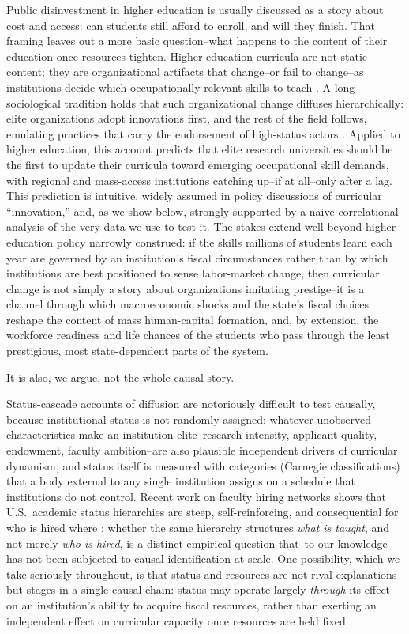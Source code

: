 \documentclass[11pt, letterpaper]{article}
\newcommand{\parencite}[1]{\cite{#1}}
\begin{document}
Public disinvestment in higher education is usually discussed as a story about cost and access: can students still afford to enroll, and will they finish. That framing leaves out a more basic question--what happens to the content of their education once resources tighten. Higher-education curricula are not static content; they are organizational artifacts that change--or fail to change--as institutions decide which occupationally relevant skills to teach \parencite{autorskill2003, javadiansabet2024}. A long sociological tradition holds that such organizational change diffuses hierarchically: elite organizations adopt innovations first, and the rest of the field follows, emulating practices that carry the endorsement of high-status actors \parencite{podolny1993, phillipszuckerman2001, strangsoule1998, dimaggiopowell1983}. Applied to higher education, this account predicts that elite research universities should be the first to update their curricula toward emerging occupational skill demands, with regional and mass-access institutions catching up--if at all--only after a lag. This prediction is intuitive, widely assumed in policy discussions of curricular ``innovation,'' and, as we show below, strongly supported by a naive correlational analysis of the very data we use to test it. The stakes extend well beyond higher-education policy narrowly construed: if the skills millions of students learn each year are governed by an institution's fiscal circumstances rather than by which institutions are best positioned to sense labor-market change, then curricular change is not simply a story about organizations imitating prestige--it is a channel through which macroeconomic shocks and the state's fiscal choices reshape the content of mass human-capital formation, and, by extension, the workforce readiness and life chances of the students who pass through the least prestigious, most state-dependent parts of the system.

It is also, we argue, not the whole causal story.

Status-cascade accounts of diffusion are notoriously difficult to test causally, because institutional status is not randomly assigned: whatever unobserved characteristics make an institution elite--research intensity, applicant quality, endowment, faculty ambition--are also plausible independent drivers of curricular dynamism, and status itself is measured with categories (Carnegie classifications) that a body external to any single institution assigns on a schedule that institutions do not control. Recent work on faculty hiring networks shows that U.S.\ academic status hierarchies are steep, self-reinforcing, and consequential for who is hired where \parencite{clauset2015}; whether the same hierarchy structures \emph{what is taught}, and not merely \emph{who is hired}, is a distinct empirical question that--to our knowledge--has not been subjected to causal identification at scale. One possibility, which we take seriously throughout, is that status and resources are not rival explanations but stages in a single causal chain: status may operate largely \emph{through} its effect on an institution's ability to acquire fiscal resources, rather than exerting an independent effect on curricular capacity once resources are held fixed \parencite{clauset2015}.
\end{document}

